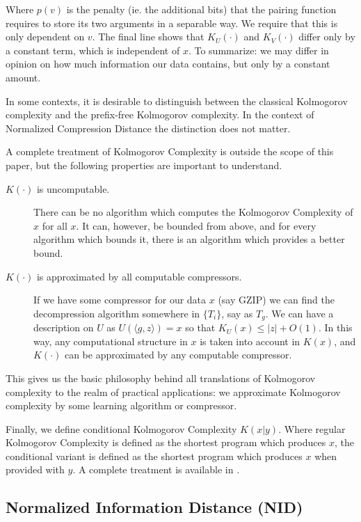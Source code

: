 \documentclass{article}
\begin{document}
Where $p(v)$ is the penalty (ie. the additional bits) that the pairing function requires to store its two arguments in a separable way. We require that this is only dependent on $v$. The final line shows that $K_U(\cdot)$ and $K_V(\cdot)$ differ only by a constant term, which is independent of $x$. To summarize: we may differ in opinion on how much information our data contains, but only by a constant amount.
  
In some contexts, it is desirable to distinguish between the classical Kolmogorov complexity and the prefix-free Kolmogorov complexity. In the context of Normalized Compression Distance the distinction does not matter.

A complete treatment of Kolmogorov Complexity is outside the scope of this paper, but the following properties are important to understand.

\begin{description}
\item[$K(\cdot)$ is uncomputable.] There can be no algorithm which computes the Kolmogorov Complexity of $x$ for all $x$. It can, however, be bounded from above, and for every algorithm which bounds it, there is an algorithm which provides a better bound. 
\item[$K(\cdot)$ is approximated by all computable compressors.] If we have some compressor for our data $x$ (say GZIP) we can find the decompression algorithm somewhere in $\{T_i\}$, say as $T_g$. We can have a description on $U$ as $U(\langle g, z\rangle) = x$ so that $K_U(x)\leq |z| + O(1)$. In this way, any computational structure in $x$ is taken into account in $K(x)$, and $K(\cdot)$ can be approximated by any computable compressor.
\end{description}

This gives us the basic philosophy behind all translations of Kolmogorov complexity to the realm of practical applications: we approximate Kolmogorov complexity by some learning algorithm or compressor. 

Finally, we define conditional Kolmogorov Complexity $K(x| y)$. Where regular Kolmogorov Complexity is defined as the shortest program which produces $x$, the conditional variant is defined as the shortest program which produces $x$ when provided with $y$. A complete treatment is available in \cite{li1997introduction}.

\subsection*{Normalized Information Distance (NID)}
\end{document}
